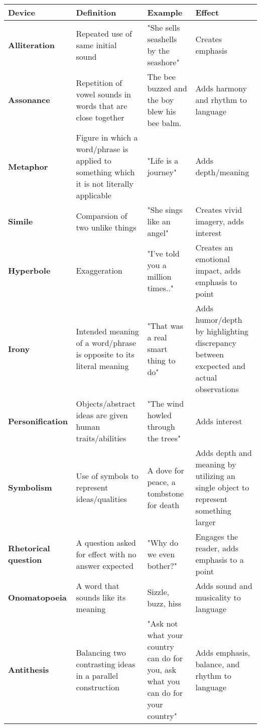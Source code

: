 \documentclass{article}
\begin{document}
	\begin{center}
		\def\arraystretch{1.1}
		\begin{tabular}{ | p{8em} | p{12em} | p{12em} | p{12em} | } 
 			\hline
			\textbf{Device} & \textbf{Definition} & \textbf{Example} & \textbf{Effect} \\ 
			\hline
			\hline
			\textbf{Alliteration} & Repeated use of same initial sound & "She sells seashells by the seashore" & Creates emphasis \\
			\hline
			\textbf{Assonance} & Repetition of vowel sounds in words that are close together & The bee buzzed and the boy blew his bee balm. & Adds harmony and rhythm to language \\
			\hline
			\textbf{Metaphor} & Figure in which a word/phrase is applied to something which it is not literally applicable & "Life is a journey" & Adds depth/meaning \\ 
 			\hline
			\textbf{Simile} & Comparsion of two unlike things & "She sings like an angel" & Creates vivid imagery, adds interest \\
			\hline
			\textbf{Hyperbole} & Exaggeration & "I've told you a million times.." & Creates an emotional impact, adds emphasis to point \\
			\hline
			\textbf{Irony} & Intended meaning of a word/phrase is opposite to its literal meaning & "That was a real smart thing to do" & Adds humor/depth by highlighting discrepancy between excpected and actual observations \\
			\hline
			\textbf{Personification} & Objects/abstract ideas are given human traits/abilities & "The wind howled through the trees" & Adds interest \\
			\hline
			\textbf{Symbolism} & Use of symbols to represent ideas/qualities & A dove for peace, a tombstone for death & Adds depth and meaning by utilizing an single object to represent something larger \\
			\hline 
			\textbf{Rhetorical question} & A question asked for effect with no answer expected & "Why do we even bother?" & Engages the reader, adds emphasis to a point \\
			\hline
			\textbf{Onomatopoeia} & A word that sounds like its meaning & Sizzle, buzz, hiss & Adds sound and musicality to language \\
			\hline
			\textbf{Antithesis} & Balancing two contrasting ideas in a parallel construction & "Ask not what your country can do for you, ask what you can do for your country" & Adds emphasis, balance, and rhythm to language \\

\end{tabular}
\end{center}
\end{document}

